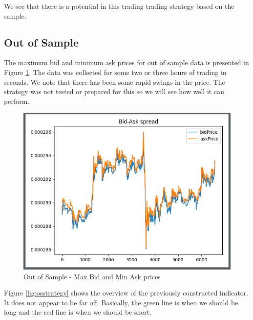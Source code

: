 \documentclass[12pt]{article}
\begin{document}
We see that there is a potential in this trading trading strategy based on the sample.
\subsection*{Out of Sample}
The maximum bid and minimum ask prices for out of sample data is presented in Figure \ref{fig:osba}. The data was collected for some two or three hours of trading in seconds. We note that there has been some rapid swings in the price. The strategy was not tested or prepared for this so we will see how well it can perform.
\begin{figure}[h!]
	\centering
  \includegraphics[scale=0.35]{os_bid_ask.png}
  \caption{Out of Sample - Max Bid and Min Ask prices}
  \label{fig:osba}
\end{figure}
\FloatBarrier

Figure \ref{fig:osstrategy} shows the overview of the previously constructed indicator. It does not appear to be far off. Basically, the green line is when we should be long and the red line is when we should be short.
\end{document}
